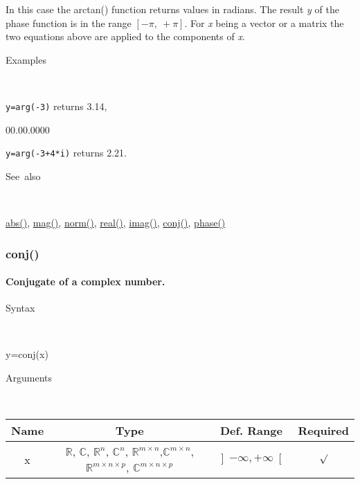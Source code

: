 In this case the arctan() function returns values in radians. The
result \textit{y} of the phase function is in the range $\left[-\pi,\:+\pi\right]$.
For \textit{x} being a vector or a matrix the two equations above
are applied to the components of \textit{x}.

\begin{description}
\item [Examples]~
\end{description}
\texttt{y=arg(-3)} returns 3.14,

\begin{lyxlist}{00.00.0000}
\item [\texttt{y=arg(-3+4{*}i)}]returns 2.21.
\end{lyxlist}
\begin{description}
\item [See~also]~
\end{description}
\textcolor{blue}{\hyperlink{abs}{abs()}}, \textcolor{blue}{\hyperlink{mag}{mag()}},
\textcolor{blue}{\hyperlink{norm}{norm()}}, \textcolor{blue}{\hyperlink{real}{real()}},
\textcolor{blue}{\hyperlink{imag}{imag()}}, \textcolor{blue}{\hyperlink{conj}{conj()}},
\textcolor{blue}{\hyperlink{phase}{phase()}}


\newpage
\subsubsection*{\hypertarget{conj}{}{\Large conj()}}


\paragraph{\label{par:Conjugate}Conjugate of a complex number.}

\begin{description}
\item [Syntax]~
\end{description}
y=conj(x)

\begin{description}
\item [Arguments]~
\end{description}
\begin{tabular}{|c|c|c|c|}
\hline 
Name&
Type&
Def. Range&
Required\tabularnewline
\hline
\hline 
x&
$\mathbb{R}$, $\mathbb{C}$, $\mathbb{R}^{n}$, $\mathbb{C}^{n}$,
$\mathbb{\mathbb{R}}^{m\times n}$,$\mathbb{\mathbb{C}}^{m\times n}$,
$\mathbb{\mathbb{R}}^{m\times n\times p}$, $\mathbb{\mathbb{C}}^{m\times n\times p}$ &
$\left]-\infty,+\infty\right[$&
$\surd$\tabularnewline
\hline
\end{tabular}

